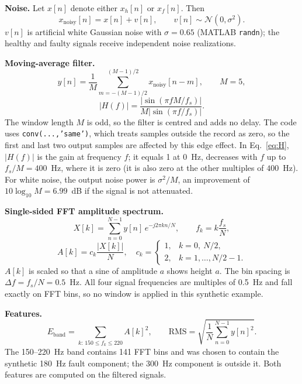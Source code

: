 \documentclass[10pt,twocolumn,a4paper]{article}
\begin{document}
\textbf{Noise.} Let $x[n]$ denote either $x_h[n]$ or $x_f[n]$. Then
\begin{equation}
x_{\mathrm{noisy}}[n]=x[n]+v[n],\qquad v[n]\sim\mathcal N(0,\sigma^{2}).\label{eq:noise}
\end{equation}
$v[n]$ is artificial white Gaussian noise with $\sigma=0.65$ (MATLAB \texttt{randn}); the healthy and faulty signals receive independent noise
realizations.

\textbf{Moving-average filter.}
\begin{equation}
y[n]=\frac1M\sum_{m=-(M-1)/2}^{(M-1)/2}x_{\mathrm{noisy}}[n-m],\qquad M=5,\label{eq:ma}
\end{equation}
\begin{equation}
|H(f)|=\frac{\left|\sin(\pi f M/f_s)\right|}{M\left|\sin(\pi f/f_s)\right|}.\label{eq:H}
\end{equation}
The window length $M$ is odd, so the filter is centred and adds no delay. The code uses \texttt{conv(...,'same')}, which treats samples
outside the record as zero, so the first and last two output samples are affected by this edge effect. In Eq.~\eqref{eq:H}, $|H(f)|$ is the gain at frequency $f$;
it equals 1 at 0~Hz, decreases with $f$ up to $f_s/M=400$~Hz, where it is zero (it is also zero at the other multiples of $400$~Hz). For white noise, the output noise power is
$\sigma^{2}/M$, an improvement of $10\log_{10}M=6.99$~dB if the signal is not attenuated.

\textbf{Single-sided FFT amplitude spectrum.}
\begin{equation}
X[k]=\sum_{n=0}^{N-1}y[n]\,e^{-j2\pi kn/N},\qquad f_k=k\frac{f_s}{N},\label{eq:fft}
\end{equation}
\begin{equation}
A[k]=c_k\frac{|X[k]|}{N},\quad c_k=\begin{cases}1,&k=0,\ N/2,\\ 2,&k=1,\dots,N/2-1.\end{cases}\label{eq:amp}
\end{equation}
$A[k]$ is scaled so that a sine of amplitude $a$ shows height $a$. The bin spacing is $\Delta f=f_s/N=0.5$~Hz. All four signal
frequencies are multiples of 0.5~Hz and fall exactly on FFT bins, so no window is applied in this synthetic example.

\textbf{Features.}
\begin{equation}
E_{\mathrm{band}}=\sum_{k:\,150\le f_k\le 220}A[k]^{2},\qquad
\mathrm{RMS}=\sqrt{\frac1N\sum_{n=0}^{N-1}y[n]^{2}}.\label{eq:feat}
\end{equation}
The 150--220~Hz band contains 141 FFT bins and was chosen to contain the synthetic 180~Hz fault component; the 300~Hz component is
outside it. Both features are computed on the filtered signals.
\end{document}
